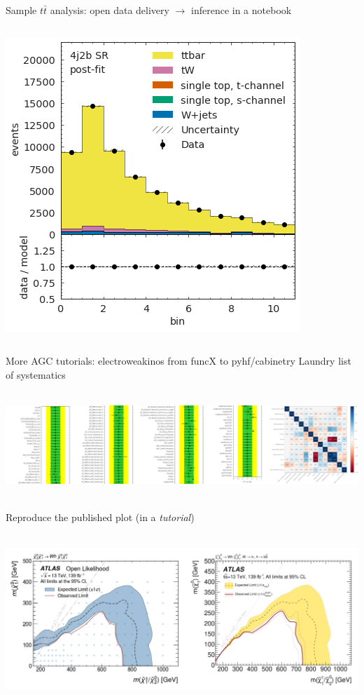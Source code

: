 \documentclass[aspectratio=169]{beamer}
\begin{document}
\begin{frame}{Sample $t\bar{t}$ analysis: open data delivery $\to$ inference in a notebook}
\begin{columns}
\begin{columns}
\vfill
\includegraphics[width=\linewidth]{PLOTS/gac-ttbar-plot-8.png}

\end{columns}
\end{columns}
\end{frame}

\begin{frame}{More AGC tutorials: electroweakinos from funcX to pyhf/cabinetry}
\vspace{0.2 cm}
Laundry list of systematics

\mbox{ } \hfill \includegraphics[width=0.77\linewidth]{PLOTS/agc-electroweakino-pulls.png} \hfill \mbox{ }

Reproduce the published plot (in a {\it tutorial})

\mbox{ } \hfill \includegraphics[width=0.77\linewidth]{PLOTS/agc-electroweakino-likelihood.png} \hfill \mbox{ }
\end{frame}
\end{document}
